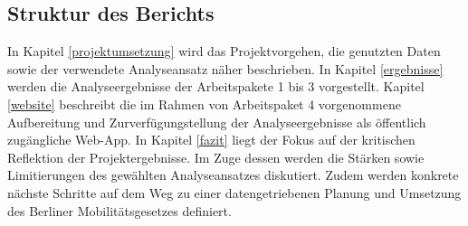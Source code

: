\subsection{Struktur des Berichts}
In Kapitel \ref{projektumsetzung} wird das Projektvorgehen, die genutzten Daten sowie der verwendete Analyseansatz näher beschrieben. In Kapitel \ref{ergebnisse} werden die Analyseergebnisse der Arbeitspakete 1 bis 3 vorgestellt. Kapitel \ref{website} beschreibt die im Rahmen von Arbeitspaket 4 vorgenommene Aufbereitung und Zurverfügungstellung der Analyseergebnisse als öffentlich zugängliche Web-App. In Kapitel \ref{fazit} liegt der Fokus auf der kritischen Reflektion der Projektergebnisse. Im Zuge dessen werden die Stärken sowie Limitierungen des gewählten Analyseansatzes diskutiert. Zudem werden konkrete nächste Schritte auf dem Weg zu einer datengetriebenen Planung und Umsetzung des Berliner Mobilitätsgesetzes definiert.
